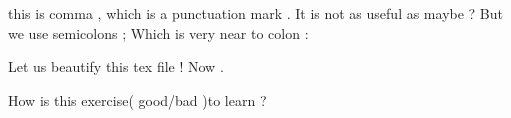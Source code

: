 \documentclass{article}
\begin{document}
this is comma    , which is a punctuation mark . It is not as useful as maybe   ? But we use semicolons ; Which is very near to colon : 

Let us beautify this tex file ! Now . 

How is this exercise(  good/bad  )to learn ? 
\end{document}
